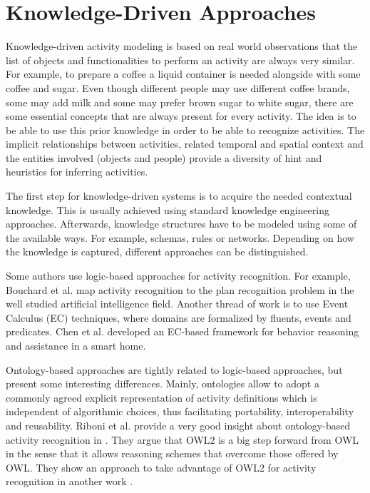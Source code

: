 \section{Knowledge-Driven Approaches}
\label{sec:soa:knowledgedriven}

Knowledge-driven activity modeling is based on real world observations that the list of objects and functionalities to perform an activity are always very similar. For example, to prepare a coffee a liquid container is needed alongside with some coffee and sugar. Even though different people may use different coffee brands, some may add milk and some may prefer brown sugar to white sugar, there are some essential concepts that are always present for every activity. The idea is to be able to use this prior knowledge in order to be able to recognize activities. The implicit relationships between activities, related temporal and spatial context and the entities involved (objects and people) provide a diversity of hint and heuristics for inferring activities.

The first step for knowledge-driven systems is to acquire the needed contextual knowledge. This is usually achieved using standard knowledge engineering approaches. Afterwards, knowledge structures have to be modeled using some of the available ways. For example, schemas, rules or networks. Depending on how the knowledge is captured, different approaches can be distinguished.

Some authors use logic-based approaches for activity recognition. For example, Bouchard et al. \cite{Bouchard2006} map activity recognition to the plan recognition problem in the well studied artificial intelligence field. Another thread of work is to use Event Calculus (EC) techniques, where domains are formalized by fluents, events and predicates. Chen et al. \cite{Chen2008} developed an EC-based framework for behavior reasoning and assistance in a smart home. 

Ontology-based approaches are tightly related to logic-based approaches, but present some interesting differences. Mainly, ontologies allow to adopt a commonly agreed explicit representation of activity definitions which is independent of algorithmic choices, thus facilitating portability, interoperability and reusability. Riboni et al. provide a very good insight about ontology-based activity recognition in \cite{Riboni2011}. They argue that OWL2 is a big step forward from OWL in the sense that it allows reasoning schemes that overcome those offered by OWL. They show an approach to take advantage of OWL2 for activity recognition in another work \cite{Riboni2011a}. 

